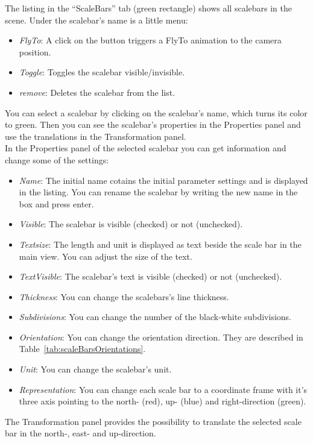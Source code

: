The listing in the ``ScaleBars'' tab (green rectangle) shows all scalebars in the scene.
Under the scalebar's name is a little menu:
\begin{itemize}
	\item \textit{FlyTo}: A click on the button triggers a FlyTo animation to the camera position.
  \item \textit{Toggle}: Toggles the scalebar visible/invisible.
  \item \textit{remove}: Deletes the scalebar from the list.
\end{itemize} 
You can select a scalebar by clicking on the scalebar's name, which turns its color to green. Then you can see the scalebar's properties in the Properties panel and use the translations in the Transformation panel. \\

In the Properties panel of the selected scalebar you can get information and change some of the settings:
\begin{itemize}
	\item \textit{Name}: The initial name cotains the initial parameter settings and is displayed in the listing. You can rename the scalebar by writing the new name in the box and press enter.
	\item \textit{Visible}: The scalebar is visible (checked) or not (unchecked).
	\item \textit{Textsize}: The length and unit is displayed as text beside the scale bar in the main view. You can adjust the size of the text.
	\item \textit{TextVisible}: The scalebar's text is visible (checked) or not (unchecked).
	\item \textit{Thickness}: You can change the scalebars's line thickness.
	\item \textit{Subdivisions}: You can change the number of the black-white subdivisions.
	\item \textit{Orientation}: You can change the orientation direction. They are described in Table~\ref{tab:scaleBarsOrientations}.
	\item \textit{Unit}: You can change the scalebar's unit.
	\item \textit{Representation}: You can change each scale bar to a coordinate frame with it's three axis pointing to the north- (red), up- (blue) and right-direction (green).
\end{itemize}

The Transformation panel provides the possibility to translate the selected scale bar in the north-, east- and up-direction.

